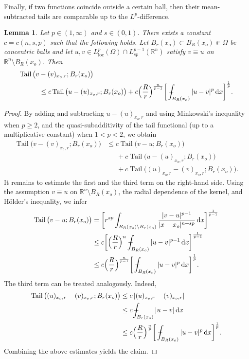 \documentclass[10pt,letterpaper]{amsart}
\newtheorem{lemma}[theorem]{Lemma}
\theoremstyle{definition}
\numberwithin{theorem}{section}
\numberwithin{equation}{section}
\newcommand{\R}{\ensuremath{\mathbb{R}}}
\newcommand{\mint}{- \mskip-19,5mu \int}
\newcommand{\1}{\ensuremath{\mathds{1}}}
\newcommand{\dx}{\mathrm{d}x}
\def\Xint#1{\mathchoice
    {\XXint\displaystyle\textstyle{#1}}%
    {\XXint\textstyle\scriptstyle{#1}}%
    {\XXint\scriptstyle\scriptscriptstyle{#1}}%
    {\XXint\scriptscriptstyle\scriptscriptstyle{#1}}%
    \!\int}
\def\XXint#1#2#3{\setbox0=\hbox{$#1{#2#3}{\int}$}
    \vcenter{\hbox{$#2#3$}}\kern-0.5\wd0}
\def\bint{\Xint-}
\DeclareMathOperator{\Tail}{Tail}
\numberwithin{equation}{section}
\begin{document}
Finally, if two functions coincide outside a certain ball, then their mean-subtracted tails are comparable up to the $L^p$-difference.


\begin{lemma}\label{lem:tv-u}
Let \(p\in(1,\infty)\) and \(s\in(0,1)\).
There exists a constant \(c=c(n,s,p)\) such that the following holds.
Let \(B_r(x_o)\subset B_R(x_o)\Subset\Omega\) be concentric balls and let
\(u,v\in L^p_{\mathrm{loc}}(\Omega)\cap L^{p-1}_{sp}(\mathbb{R}^n)\) satisfy
\(v\equiv u\) on \(\mathbb{R}^n\setminus B_R(x_o)\).
Then
\begin{align*}
    \Tail \big(v&-(v)_{x_o,r}; B_r(x_o)
    \big)\\
    &\le 
    c\Tail \big(u-(u)_{x_o,r}; B_r(x_o)\big) 
    +
        c \Big(\frac{R}{r}\Big)^{\frac{n}{p-1}}
    \bigg[
        \mint_{B_R(x_o)}
            |u-v|^{p}\,\mathrm dx
    \bigg]^{\frac{1}{p}} .
\end{align*}
\end{lemma}

\begin{proof}
By adding and subtracting \(u-(u)_{x_o,r}\) and using Minkowski’s inequality
when \(p\ge 2\), and the quasi-subadditivity of the tail functional
(up to a multiplicative constant) when \(1<p<2\), we obtain
\begin{align*}
    \Tail \big(v-(v)_{x_o,r}; B_r(x_o)\big)
    &\le 
    c\Tail \big(v-u; B_r(x_o)\big) \\
    &\phantom{\le\,} +
    c\Tail \big(u-(u)_{x_o,r}; B_r(x_o)\big) \\
    &\phantom{\le\,} +
    c\Tail \big((u)_{x_o,r}-(v)_{x_o,r}; B_r(x_o)\big) .
\end{align*}
It remains to estimate the first and the third term on the right-hand side.
Using the assumption \(v\equiv u\) on \(\R^n\setminus B_R(x_o)\), the radial
dependence of the kernel, and Hölder’s inequality, we infer
\begin{align*}
    \Tail \big(v-u; B_r(x_o)\big)
    &=
    \bigg[r^{sp}
    \int_{B_R(x_o)\setminus B_r(x_o)}
        \frac{|v-u|^{p-1}}{|x-x_o|^{n+sp}}\,\mathrm dx \bigg]^{\frac{1}{p-1}} \\
    &\le c
    \bigg[
        \Big(\frac{R}{r}\Big)^{n}
        \mint_{B_R(x_o)}
            |u-v|^{p-1}\,\mathrm dx
    \bigg]^{\frac{1}{p-1}} \\
    &\le
    c \Big(\frac{R}{r}\Big)^{\frac{n}{p-1}}
    \bigg[
        \mint_{B_R(x_o)}
            |u-v|^{p}\,\mathrm dx
    \bigg]^{\frac{1}{p}} .
\end{align*}
The third term can be treated analogously. Indeed, 
\begin{align*}
    \Tail \big((u)_{x_o,r}-(v)_{x_o,r}; B_r(x_o)\big)
    &\le 
    c\, |(u)_{x_o,r}-(v)_{x_o,r}| \\
    &\le 
    c\, \bint_{B_r(x_o)} |u-v| \,\dx   \\
    &\le 
    c \Big(\frac{R}{r}\Big)^{\frac{n}{p}}
    \bigg[
        \mint_{B_R(x_o)}
            |u-v|^{p}\,\mathrm dx
    \bigg]^{\frac{1}{p}} .
\end{align*}
Combining the above estimates yields the claim.
\end{proof}
\end{document}
